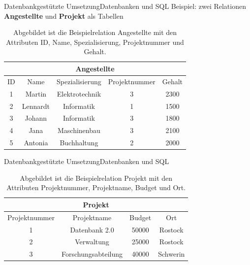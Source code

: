 \documentclass[10pt]{beamer} %
\begin{document}
\begin{frame}{Datenbankgestützte Umsetzung}{Datenbanken und SQL}
   Beispiel: 
   zwei Relationen \textbf{Angestellte} und \textbf{Projekt} als Tabellen
\begin{table}[h]
    \centering
\begin{tabular}{|c|c|c|c|c|} \hline
    \multicolumn{5}{|c|}{\textbf{Angestellte}} \\ \hline
    \hline
    ID &Name &Spezialisierung &Projektnummer &Gehalt\\ 
    \hline
    1 &Martin &Elektrotechnik &3 &2300\\ 
    \hline
    2 &Lennardt &Informatik &1 &1500\\
    \hline
    3 &Johann &Informatik &3 &1800\\
    \hline
    4 &Jana &Maschinenbau &3 &2100\\
    \hline
    5 &Antonia &Buchhaltung &2 &2000\\ 
    \hline
\end{tabular}
\caption[Beispielrelation \textbf{Angestellte}]{Abgebildet ist die Beispielrelation Angestellte mit den Attributen ID, Name, Spezialisierung, Projektnummer und Gehalt.}
\label{abb:angestellte}
\end{table}

\end{frame}

\begin{frame}{Datenbankgestützte Umsetzung}{Datenbanken und SQL}
   

\begin{table}[H]
    \centering
\begin{tabular}{|c|c|c|c|} \hline
    \multicolumn{4}{|c|}{\textbf{Projekt}} \\ \hline
    \hline
    Projektnummer &Projektname &Budget &Ort \\ 
    \hline
    1 &Datenbank 2.0 &50000 &Rostock \\ 
    \hline
    2 &Verwaltung &25000 &Rostock \\
    \hline
    3 &Forschungsabteilung  &40000 &Schwerin\\ 
    \hline
\end{tabular}
\caption[Beispielrelation \textbf{Projekt}]{Abgebildet ist die Beispielrelation Projekt mit den Attributen Projektnummer, Projektname, Budget und Ort.}
\label{abb:projekt}
\end{table}
\end{frame}
\end{document}
